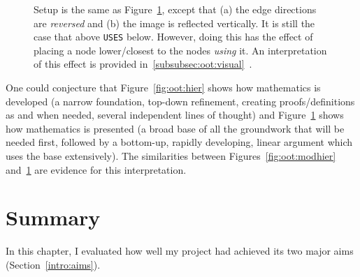 \begin{figure}[tp]
\begin{minipage}{0.5\textwidth-0.5em}
      \caption{Setup is the same as Figure~\ref{fig:oot:hierflip}, except that
      (a) the edge directions are \emph{reversed} and (b) the image is
      reflected vertically. It is still the case that above \texttt{USES} below.
      However, doing this has the effect of placing a node lower/closest to
      the nodes \emph{using} it. An interpretation of this effect is provided
      in~\ref{subsubsec:oot:visual}~.}\label{fig:oot:hierflip}
  \end{minipage}
\end{figure}

One could conjecture that Figure~\ref{fig:oot:hier} shows how mathematics is
developed (a narrow foundation, top-down refinement, creating proofs/definitions
as and when needed, several independent lines of thought) and
Figure~\ref{fig:oot:hierflip} shows how mathematics is presented (a broad base
of all the groundwork that will be needed first, followed by a bottom-up,
rapidly developing, linear argument which uses the base extensively). The
similarities between Figures~\ref{fig:oot:modhier} and~\ref{fig:oot:hierflip}
are evidence for this interpretation.

\section{Summary}

In this chapter, I evaluated how well my project had achieved its two major aims
(Section~\ref{intro:aims}).

